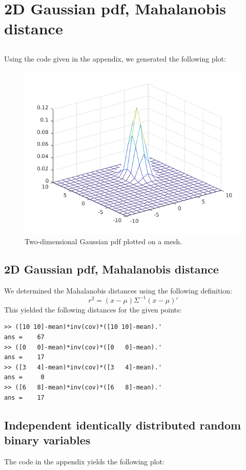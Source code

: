 \documentclass[10pt]{article}
\begin{document}
\section{2D Gaussian pdf, Mahalanobis distance}
\subsection{}
Using the code given in the appendix, we generated the following plot:
\begin{figure}[H]
 \centering
 \includegraphics[width=.7\textwidth]{Ass31.png}
 \caption{Two-dimensional Gaussian pdf plotted on a mesh.}
 \label{31}
\end{figure}

\subsection{2D Gaussian pdf, Mahalanobis distance}
We determined the Mahalanobis distances using the following definition:
\begin{equation}
r^2=(x-\mu)\Sigma^{-1}(x-\mu)'
\end{equation}
This yielded the following distances for the given points:
\begin{lstlisting}
>> ([10 10]-mean)*inv(cov)*([10 10]-mean).'
ans =    67
>> ([0   0]-mean)*inv(cov)*([0   0]-mean).'
ans =    17
>> ([3   4]-mean)*inv(cov)*([3   4]-mean).'
ans =     0
>> ([6   8]-mean)*inv(cov)*([6   8]-mean).'
ans =    17
\end{lstlisting}

\subsection{Independent identically distributed random binary variables}
The code in the appendix yields the following plot:
\end{document}
